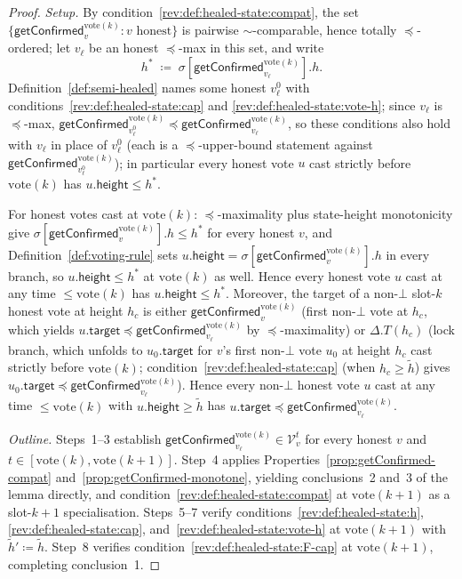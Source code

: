 \documentclass{article}
\newcommand{\V}[0]{\ensuremath{\mathcal{V}}}
\newcommand{\target}{\mathsf{target}}
\newcommand{\height}{\mathsf{height}}
\newcommand{\vote}{\ensuremath{\mathrm{vote}}}
\newcommand{\comm}[1]{\ensuremath{\widetilde{#1}}}
\newcommand{\getConfirmed}{\textsf{getConfirmed}\xspace}
\theoremstyle{plain}
\theoremstyle{definition}
\theoremstyle{remark}
\begin{document}
\begin{proof}

\emph{Setup.}
By condition~\ref{rev:def:healed-state:compat}, the set $\{\getConfirmed_v^{\vote(k)} : v \text{ honest}\}$ is pairwise $\sim$-comparable, hence totally $\preceq$-ordered;
let $v_\ell$ be an honest $\preceq$-max in this set, and write
\[
  h^\ast \;\coloneqq\; \sigma[\getConfirmed_{v_\ell}^{\vote(k)}].h.
\]
Definition~\ref{def:semi-healed} names some honest $v_\ell^0$ with conditions~\ref{rev:def:healed-state:cap} and \ref{rev:def:healed-state:vote-h};
since $v_\ell$ is $\preceq$-max, $\getConfirmed_{v_\ell^0}^{\vote(k)} \preceq \getConfirmed_{v_\ell}^{\vote(k)}$, so these conditions also hold with $v_\ell$ in place of $v_\ell^0$ (each is a $\preceq$-upper-bound statement against $\getConfirmed_{v_\ell^0}^{\vote(k)}$);
in particular every honest vote $u$ cast strictly before $\vote(k)$ has $u.\height \leq h^\ast$.

For honest votes cast at $\vote(k)$:
$\preceq$-maximality plus state-height monotonicity give $\sigma[\getConfirmed_v^{\vote(k)}].h \leq h^\ast$ for every honest $v$, and Definition~\ref{def:voting-rule} sets $u.\height = \sigma[\getConfirmed_v^{\vote(k)}].h$ in every branch, so $u.\height \leq h^\ast$ at $\vote(k)$ as well.
Hence every honest vote $u$ cast at any time $\leq \vote(k)$ has $u.\height \leq h^\ast$.
Moreover, the target of a non-$\bot$ slot-$k$ honest vote at height $h_c$ is either $\getConfirmed_v^{\vote(k)}$ (first non-$\bot$ vote at $h_c$, which yields $u.\target \preceq \getConfirmed_{v_\ell}^{\vote(k)}$ by $\preceq$-maximality) or $\Delta.T(h_c)$ (lock branch, which unfolds to $u_0.\target$ for $v$'s first non-$\bot$ vote $u_0$ at height $h_c$ cast strictly before $\vote(k)$; condition~\ref{rev:def:healed-state:cap} (when $h_c \geq \comm{h}$) gives $u_0.\target \preceq \getConfirmed_{v_\ell}^{\vote(k)}$).
Hence every non-$\bot$ honest vote $u$ cast at any time $\leq \vote(k)$ with $u.\height \geq \comm{h}$ has $u.\target \preceq \getConfirmed_{v_\ell}^{\vote(k)}$.

\emph{Outline.}
Steps~1--3 establish $\getConfirmed_{v_\ell}^{\vote(k)} \in \V_v^t$ for every honest $v$ and $t \in [\vote(k), \vote(k{+}1)]$.
Step~4 applies Properties~\ref{prop:getConfirmed-compat} and~\ref{prop:getConfirmed-monotone}, yielding conclusions~2 and~3 of the lemma directly, and condition~\ref{rev:def:healed-state:compat} at $\vote(k{+}1)$ as a slot-$k{+}1$ specialisation.
Steps~5--7 verify conditions~\ref{rev:def:healed-state:h}, \ref{rev:def:healed-state:cap}, and~\ref{rev:def:healed-state:vote-h} at $\vote(k{+}1)$ with $\comm{h}' \coloneqq \comm{h}$.
Step~8 verifies condition~\ref{rev:def:healed-state:F-cap} at $\vote(k{+}1)$, completing conclusion~1.


\end{proof}
\end{document}
